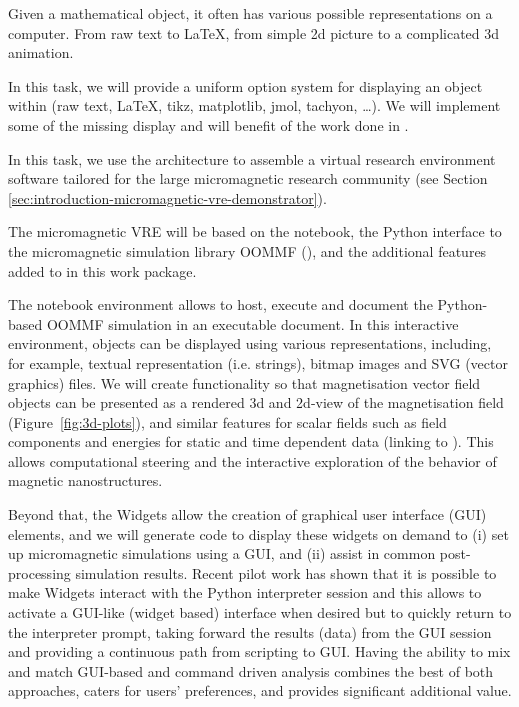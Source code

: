 \begin{workpackage}
\begin{tasklist}
\begin{task}[lead=UB,title=Common option system for various displays
  in Sage,id=Sage-display,PM=12,wphases=0-24,issue=78]
  Given a mathematical object, it often has various possible
  representations on a computer. From raw text to \LaTeX, from simple
  2d picture to a complicated 3d animation.

  In this task, we will provide a uniform option system for displaying
  an object within \Sage (raw text, \LaTeX, tikz, matplotlib, jmol,
  tachyon, \ldots). We will implement some of the missing display and
  will benefit of the work done in .
\end{task}

\begin{task}[lead=USO,title=Case study: micromagnetic VRE built from
  \TheProject,id=oommf-py-ipython-attributes,PM=6,partners={SR,USH},wphases=13-19,issue=79]
  In this task, we use the \TheProject architecture to assemble a
  virtual research environment software tailored for the large
  micromagnetic research community
  (see Section \ref{sec:introduction-micromagnetic-vre-demonstrator}).

  The micromagnetic VRE will be based on the \Jupyter notebook, the
  Python interface to the micromagnetic simulation library OOMMF
  (),
  and the additional features added to \Jupyter in this work
  package.

  The \Jupyter notebook environment allows to host, execute and
  document the Python-based OOMMF simulation in an executable
  document. In this interactive environment, objects can be displayed
  using various representations, including, for example, textual
  representation (i.e. strings), bitmap images and SVG (vector
  graphics) files. We will create functionality so that magnetisation
  vector field objects can be presented as a rendered 3d and 2d-view
  of the magnetisation field (Figure~\ref{fig:3d-plots}), and similar
  features for scalar fields such as field components and energies for
  static and time dependent data (linking to
  ). This allows computational steering and the
  interactive exploration of the behavior of magnetic nanostructures.

  Beyond that, the \Jupyter Widgets allow the creation of graphical
  user interface (GUI) elements, and we will generate code to display
  these widgets on demand to (i) set up micromagnetic simulations
  using a GUI, and (ii) assist in common post-processing simulation
  results. Recent pilot work has shown that it is possible to make
  \Jupyter Widgets interact with the Python interpreter session and
  this allows to activate a GUI-like (widget based) interface when
  desired but to quickly return to the interpreter prompt, taking
  forward the results (data) from the GUI session
  \cite{IPython-widget-GUI-demo-youtube-2014} and providing a
  continuous path from scripting to GUI. Having the ability to mix and
  match GUI-based and command driven analysis combines the best of
  both approaches, caters for users' preferences, and provides
  significant additional value.
\end{task}


\end{tasklist}
\end{workpackage}

